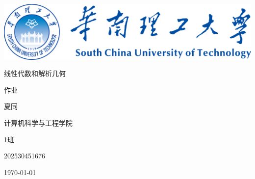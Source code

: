 \begin{titlepage}
    \centering
    \vspace*{0.5cm}
        \includegraphics[width=\textwidth]{flg/mylogo.png} %
    \par\vspace{1cm}
    {\fontsize{55}{55}\selectfont\songti 线性代数和解析几何 \par}
    \vspace{0.1cm} %
    {\fontsize{65}{65}\selectfont\songti 作业 \par}
    \vspace{1cm} %
    {\Large {} 夏同 \par}
    \vspace{0.1cm}
    {\Large {} 计算机科学与工程学院 \par}
    \vspace{0.1cm}
    {\Large {} 1班 \par}
    \vspace{0.1cm}
    {\Large {} 202530451676 \par}
    \vspace{0.1cm}
    {\Large {} \today \par}
    \vspace{0.1cm}
\end{titlepage}